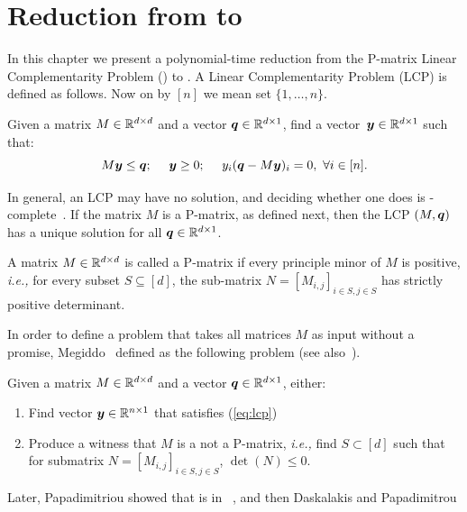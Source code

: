 \chapter{Reduction from \PLCP to \EOPL}
\label{sec:PLCPtoEOPL}

In this chapter we present a polynomial-time reduction from the P-matrix Linear
Complementarity Problem (\PLCP) to \EOPL.
A Linear Complementarity Problem (LCP) is defined as follows. Now on by $[n]$ we mean set $\{1,\dots,n\}$.

\begin{definition}[LCP]
\label{def:lcp}
Given a matrix $M \in \mathbb{R}^{d \times d}$ and a vector $\mbox{\boldmath $q$}\in \mathbb{R}^{d\times 1}$,
find a vector~{$\mbox{\boldmath $y$}\in \mathbb{R}^{d \times 1}$} such that:
\begin{equation}\label{eq:lcp}
M\mbox{\boldmath $y$}\le \mbox{\boldmath $q$};\ \ \ \ \mbox{\boldmath $y$}\ge 0;\ \ \ \ y_i(\mbox{\boldmath $q$} - M\mbox{\boldmath $y$})_i =0,\ \forall i \in [n].
\end{equation}
\end{definition}
%
In general, an LCP may have no solution, and deciding whether one does is
\NP-complete~\cite{chung1989np}. If the matrix $M$ is a P-matrix, as defined
next, then the LCP $(M,\mbox{\boldmath $q$})$ has a unique solution for all $\mbox{\boldmath $q$}\in \mathbb{R}^{d\times
1}$.
%
\begin{definition}[P-matrix]
\label{def:Pmatrix}
A matrix $M \in \mathbb{R}^{d \times d}$ is called a P-matrix if every principle
minor of $M$ is positive, {\em i.e.,} for every subset $S\subseteq[d]$, the
sub-matrix $N=[M_{i,j}]_{i\in S, j\in S}$ has strictly positive determinant. 
\end{definition}
%
In order to define a problem that takes all matrices $M$ as input without 
a promise, Megiddo~\cite{megiddo1988note} defined \PLCP as the following problem
(see also~\cite{megiddo1991total}).
%
\begin{definition}[\PLCP] \label{def:plcp} Given a matrix $M\in \mathbb{R}^{d\times
d}$ and a vector $\mbox{\boldmath $q$}\in \mathbb{R}^{d\times 1}$, either:
\begin{enumerate}[label=(Q\arabic*)] \item Find vector $\mbox{\boldmath $y$} \in \mathbb{R}^{n
			\times 1}$ that satisfies (\ref{eq:lcp}) \item Produce a witness
that $M$ is a not a P-matrix, {\em i.e.,} find $S\subset [d]$ such that for
submatrix $N=[M_{i,j}]_{i\in S, j\in S}$, $\det(N)\le 0$.  \end{enumerate}
\end{definition}
%
Later, Papadimitriou showed that \PLCP is in
\PPAD~\cite{papadimitriou1994complexity}, and then Daskalakis and Papadimitrou
